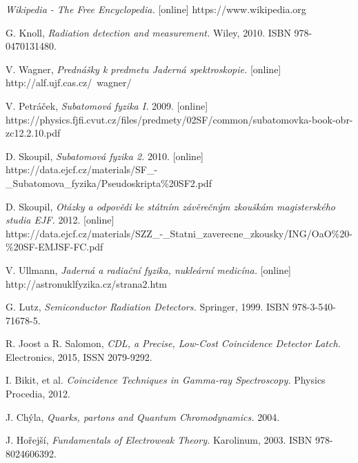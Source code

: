 \documentclass[12pt]{book}
\begin{document}












\begin{thebibliography}{1}

 \textit{Wikipedia - The Free Encyclopedia.} [online] https://www.wikipedia.org

 G. Knoll, \textit{Radiation detection and measurement.} Wiley, 2010. ISBN 978-0470131480.

 V. Wagner, \textit{Prednášky k predmetu Jaderná spektroskopie.} [online] http://alf.ujf.cas.cz/~wagner/

 V. Petráček, \textit{Subatomová fyzika I.} 2009. [online] \\ https://physics.fjfi.cvut.cz/files/predmety/02SF/common/subatomovka-book-obr-zc12.2.10.pdf

 D. Skoupil, \textit{Subatomová fyzika 2.} 2010. [online] https://data.ejcf.cz/materials/SF\_-\_Subatomova\_fyzika/Pseudoskripta\%20SF2.pdf

 D. Skoupil, \textit{Otázky a odpovědi ke státním závěrečným zkouškám magisterského studia EJF.} 2012. [online] \\https://data.ejcf.cz/materials/SZZ\_-\_Statni\_zaverecne\_zkousky/ING/OaO\%20-\%20SF-EMJSF-FC.pdf

 V. Ullmann, \textit{Jaderná a radiační fyzika, nukleární medicína.} [online] \\http://astronuklfyzika.cz/strana2.htm

 G. Lutz, \textit{Semiconductor Radiation Detectors.} Springer, 1999. ISBN 978-3-540-71678-5.

 R. Joost a R. Salomon, \textit{CDL, a Precise, Low-Cost Coincidence Detector Latch.} Electronics, 2015, ISSN 2079-9292.

 I. Bikit, et al. \textit{Coincidence Techniques in Gamma-ray Spectroscopy.} Physics Procedia, 2012.

 J. Chýla, \textit{Quarks, partons and Quantum Chromodynamics.} 2004.

 J. Hořejší, \textit{Fundamentals of Electroweak Theory.} Karolinum, 2003. ISBN 978-8024606392.


\end{thebibliography}
\end{document}
